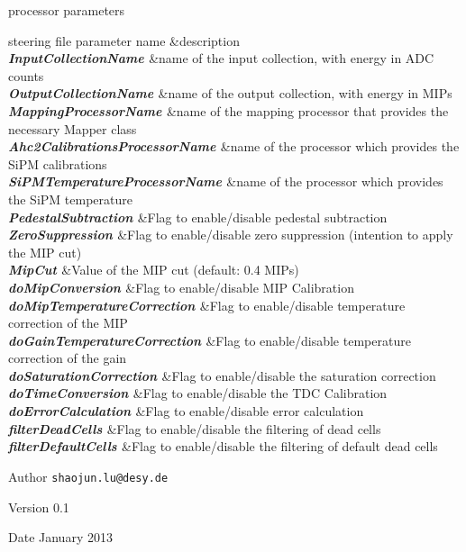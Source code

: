 \begin{DoxyParagraph}{processor parameters}
\begin{TabularC}{2}
\hline
steering file parameter name &description  \\
{\bfseries {\itshape  InputCollectionName \/}}&name of the input collection, with energy in ADC counts \\
{\bfseries {\itshape  OutputCollectionName \/}}&name of the output collection, with energy in MIPs \\
{\bfseries {\itshape  MappingProcessorName \/}}&name of the mapping processor that provides the necessary Mapper class \\
{\bfseries {\itshape  Ahc2CalibrationsProcessorName \/}}&name of the processor which provides the SiPM calibrations \\
{\bfseries {\itshape  SiPMTemperatureProcessorName \/}}&name of the processor which provides the SiPM temperature \\
{\bfseries {\itshape  PedestalSubtraction \/}}&Flag to enable/disable pedestal subtraction \\
{\bfseries {\itshape  ZeroSuppression \/}}&Flag to enable/disable zero suppression (intention to apply the MIP cut) \\
{\bfseries {\itshape  MipCut \/}}&Value of the MIP cut (default: 0.4 MIPs) \\
{\bfseries {\itshape  doMipConversion \/}}&Flag to enable/disable MIP Calibration \\
{\bfseries {\itshape  doMipTemperatureCorrection \/}}&Flag to enable/disable temperature correction of the MIP \\
{\bfseries {\itshape  doGainTemperatureCorrection \/}}&Flag to enable/disable temperature correction of the gain \\
{\bfseries {\itshape  doSaturationCorrection \/}}&Flag to enable/disable the saturation correction \\
{\bfseries {\itshape  doTimeConversion \/}}&Flag to enable/disable the TDC Calibration \\
{\bfseries {\itshape  doErrorCalculation \/}}&Flag to enable/disable error calculation \\
{\bfseries {\itshape  filterDeadCells \/}}&Flag to enable/disable the filtering of dead cells \\
{\bfseries {\itshape  filterDefaultCells \/}}&Flag to enable/disable the filtering of default dead cells \\
\end{TabularC}

\end{DoxyParagraph}
\begin{DoxyAuthor}{Author}
{\tt shaojun.lu@desy.de} 
\end{DoxyAuthor}
\begin{DoxyVersion}{Version}
0.1 
\end{DoxyVersion}
\begin{DoxyDate}{Date}
January 2013 
\end{DoxyDate}


